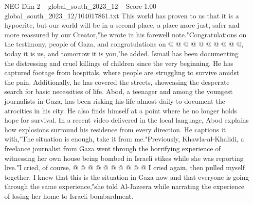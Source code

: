 \begin{textsample}{NEG Dim 2 – global\_south\_2023\_12 – Score 1.00 – global\_south\_2023\_12/104017861.txt}
This world has proven to us that it is a hypocrite, but our world will be in a second place, a place more just, safer and more reassured by our Creator,"he wrote in his farewell note."Congratulations on the testimony, people of Gaza, and congratulations on @ @ @ @ @ @ @ @ @ @, today it is us, and tomorrow it is you,"he added.
Ismail has been documenting the distressing and cruel killings of children since the very beginning.
He has captured footage from hospitals, where people are struggling to survive amidst the pain.
Additionally, he has covered the streets, showcasing the desperate search for basic necessities of life.
Abod, a teenager and among the youngest journalists in Gaza, has been risking his life almost daily to document the atrocities in his city.
He also finds himself at a point where he no longer holds hope for survival.
In a recent video delivered in the local language, Abod explains how explosions surround his residence from every direction.
He captions it with,"The situation is enough, take it from me."Previously, Khawla-al-Khalidi, a freelance journalist from Gaza went through the horrifying experience of witnessing her own house being bombed in Israeli stikes while she was reporting live."I cried, of course, @ @ @ @ @ @ @ @ @ @ I cried again, then pulled myself together.
I knew that this is the situation in Gaza now and that everyone is going through the same experience,"she told Al-Jazeera while narrating the experience of losing her home to Israeli bombardment.

\end{textsample}
